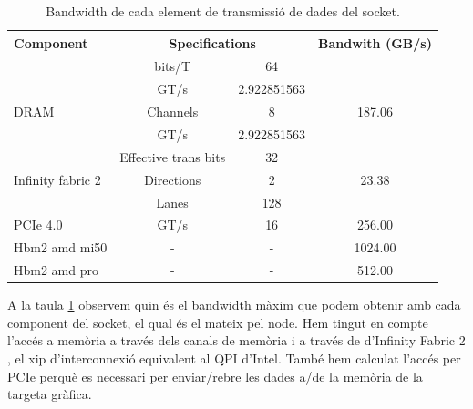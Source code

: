 \begin{table}[h]
\begin{adjustwidth}{-1.5in}{-1.5in}
\begin{center}
\begin{tabular}{l||c|c|c}
    \hline
Component                           & \multicolumn{2}{c|}{Specifications}                                         & Bandwith (GB/s)          \\ \hline  \hline 
                                    & \cellcolor[HTML]{EFEFEF}bits/T               & \cellcolor[HTML]{EFEFEF}64  &                          \\
                                    & GT/s                                         & 2.922851563                 &                          \\
    \multirow{-3}{*}{DRAM}              & \cellcolor[HTML]{EFEFEF}Channels             & \cellcolor[HTML]{EFEFEF}8   & \multirow{-3}{*}{187.06} \\ \hline
                                    & GT/s                                         & 2.922851563                 &                          \\
                                    & \cellcolor[HTML]{EFEFEF}Effective trans bits & \cellcolor[HTML]{EFEFEF}32  &                          \\
    \multirow{-3}{*}{Infinity fabric 2} & Directions                                   & 2                           & \multirow{-3}{*}{23.38}  \\ \hline
                                    & \cellcolor[HTML]{EFEFEF}Lanes                & \cellcolor[HTML]{EFEFEF}128 &                          \\
\multirow{-2}{*}{PCIe 4.0}          & GT/s                                         & 16                          & \multirow{-2}{*}{256.00} \\ \hline
\multirow{-1}{*}{Hbm2 amd mi50} & \cellcolor[HTML]{EFEFEF}- & \cellcolor[HTML]{EFEFEF}- & 1024.00 \\ \hline
\multirow{-1}{*}{Hbm2 amd pro} & - & - & 512.00 \\ \hline
\end{tabular}
    \caption{Bandwidth de cada element de transmissió de dades del socket.}
    \label{tab:peak_bw}
\end{center}
\end{adjustwidth}
\end{table}

A la taula \ref{tab:peak_bw} observem quin és el bandwidth màxim que podem obtenir amb cada component del socket, el qual és el mateix pel node. Hem tingut en compte l'accés a memòria a través dels canals de memòria i a través de d'Infinity Fabric 2 \cite{amd_if2}, el xip d'interconnexió equivalent al QPI d'Intel. També hem calculat l'accés per PCIe perquè es necessari per enviar/rebre les dades a/de la memòria de la targeta gràfica.


